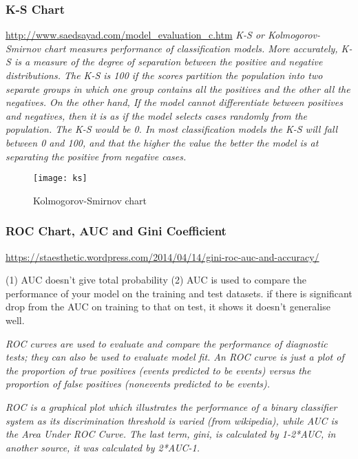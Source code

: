 \subsubsection{K-S Chart}
\url{http://www.saedsayad.com/model_evaluation_c.htm}
\textit{K-S or Kolmogorov-Smirnov chart measures performance of classification models. More accurately, K-S is a measure of the degree of separation between the positive and negative distributions. The K-S is 100 if the scores partition the population into two separate groups in which one group contains all the positives and the other all the negatives. On the other hand, If the model cannot differentiate between positives and negatives, then it is as if the model selects cases randomly from the population. The K-S would be 0. In most classification models the K-S will fall between 0 and 100, and that the higher the value the better the model is at separating the positive from negative cases.}

\begin{figure}[H]
	\texttt{[image: ks]}
	\caption[Kolmogorov-Smirnov chart ]
	{Kolmogorov-Smirnov chart }
	\label{fig:ks}
\end{figure}



\subsubsection{ROC Chart, AUC and Gini Coefficient}
\url{https://staesthetic.wordpress.com/2014/04/14/gini-roc-auc-and-accuracy/}

(1) AUC doesn't give total probability 
(2) AUC is used to compare the performance of your model on the training and test datasets. if there is significant drop from the AUC on training to that on test, it shows it doesn't generalise well.

\textit{ROC curves are used to evaluate and compare the performance of diagnostic tests; they can also be used to evaluate model fit. An ROC curve is just a plot of the proportion of true positives (events predicted to be events) versus the proportion of false positives (nonevents predicted to be events).}

\textit{ROC is a graphical plot which illustrates the performance of a binary classifier system as its discrimination threshold is varied (from wikipedia), while AUC is the Area Under ROC Curve. The last term, gini, is calculated by 1-2*AUC, in another source, it was calculated by 2*AUC-1.}

